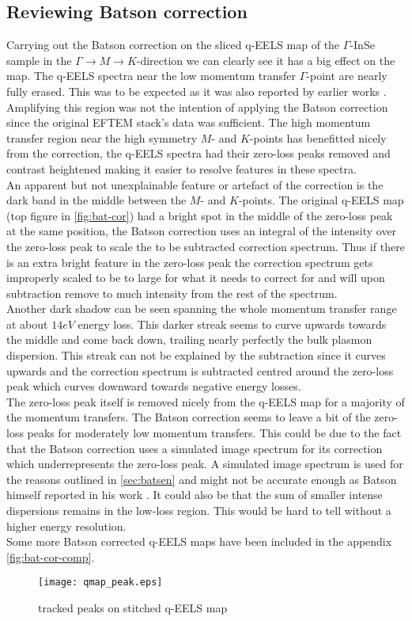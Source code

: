 \subsection{Reviewing Batson correction}
Carrying out the Batson correction on the sliced q-EELS map of the $\Gamma$-InSe sample in the $\Gamma \rightarrow M \rightarrow K$-direction we can clearly see it has a big effect on the map. The q-EELS spectra near the low momentum transfer $\Gamma$-point are nearly fully erased. This was to be expected as it was also reported by earlier works \cite{Schneider:191230}. Amplifying this region was not the intention of applying the Batson correction since the original EFTEM stack's data was sufficient. The high momentum transfer region near the high symmetry $M$- and $K$-points has benefitted nicely from the correction, the q-EELS spectra had their zero-loss peaks removed and contrast heightened making it easier to resolve features in these spectra.\\
An apparent but not unexplainable feature or artefact of the correction is the dark band in the middle between the $M$- and $K$-points. The original q-EELS map (top figure in \ref{fig:bat-cor}) had a bright spot in the middle of the zero-loss peak at the same position, the Batson correction uses an integral of the intensity over the zero-loss peak to scale the to be subtracted correction spectrum. Thus if there is an extra bright feature in the zero-loss peak the correction spectrum gets improperly scaled to be to large for what it needs to correct for and will upon subtraction remove to much intensity from the rest of the spectrum.\\
Another dark shadow can be seen spanning the whole momentum transfer range at about $14eV$ energy loss. This darker streak seems to curve upwards towards the middle and come back down, trailing nearly perfectly the bulk plasmon dispersion. This streak can not be explained by the subtraction since it curves upwards and the correction spectrum is subtracted centred around the zero-loss peak which curves downward towards negative energy losses.\\
The zero-loss peak itself is removed nicely from the q-EELS map for a majority of the momentum transfers. The Batson correction seems to leave a bit of the zero-loss peaks for moderately low momentum transfers. This could be due to the fact that the Batson correction uses a simulated image spectrum for its correction which underrepresents the zero-loss peak. A simulated image spectrum is used for the reasons outlined in \ref{sec:batsen} and might not be accurate enough as Batson himself reported in his work \cite{PhysRevB.27.5224}. It could also be that the sum of smaller intense dispersions remains in the low-loss region. This would be hard to tell without a higher energy resolution.\\
Some more Batson corrected q-EELS maps have been included in the appendix \ref{fig:bat-cor-comp}.
\newpage
%
\begin{figure}[h!]
	\centering
	\texttt{[image: qmap\_peak.eps]}
	\caption{tracked peaks on stitched q-EELS map}
	\label{fig:qmap-track}
\end{figure}

